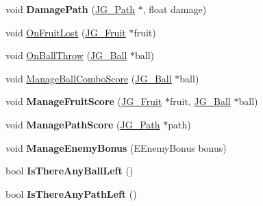 \begin{DoxyCompactItemize}
\item 
\hypertarget{class_j_g___game___main_a812e0b1a29d91eec2f14019050f218ad}{void {\bfseries Damage\-Path} (\hyperlink{class_j_g___path}{J\-G\-\_\-\-Path} $\ast$, float damage)}\label{class_j_g___game___main_a812e0b1a29d91eec2f14019050f218ad}

\item 
void \hyperlink{class_j_g___game___main_aa127943d6acddb67599f5f3c521036d4}{On\-Fruit\-Lost} (\hyperlink{class_j_g___fruit}{J\-G\-\_\-\-Fruit} $\ast$fruit)
\item 
void \hyperlink{class_j_g___game___main_a3f4638b76e1e77c65c09da991f650ba6}{On\-Ball\-Throw} (\hyperlink{class_j_g___ball}{J\-G\-\_\-\-Ball} $\ast$ball)
\item 
void \hyperlink{class_j_g___game___main_ab239739c2b97a9142033fb82663d7a06}{Manage\-Ball\-Combo\-Score} (\hyperlink{class_j_g___ball}{J\-G\-\_\-\-Ball} $\ast$ball)
\item 
\hypertarget{class_j_g___game___main_afb2172d8b7a81a333cc80086bd45b602}{void {\bfseries Manage\-Fruit\-Score} (\hyperlink{class_j_g___fruit}{J\-G\-\_\-\-Fruit} $\ast$fruit, \hyperlink{class_j_g___ball}{J\-G\-\_\-\-Ball} $\ast$ball)}\label{class_j_g___game___main_afb2172d8b7a81a333cc80086bd45b602}

\item 
\hypertarget{class_j_g___game___main_a70734f6453c3e3014e0cfc2f501e3963}{void {\bfseries Manage\-Path\-Score} (\hyperlink{class_j_g___path}{J\-G\-\_\-\-Path} $\ast$path)}\label{class_j_g___game___main_a70734f6453c3e3014e0cfc2f501e3963}

\item 
\hypertarget{class_j_g___game___main_ac5458eda3344af1f31fa97b5d1000f62}{void {\bfseries Manage\-Enemy\-Bonus} (E\-Enemy\-Bonus bonus)}\label{class_j_g___game___main_ac5458eda3344af1f31fa97b5d1000f62}

\item 
\hypertarget{class_j_g___game___main_a9c8fad5fdfbf1beb715db909d93e88e5}{bool {\bfseries Is\-There\-Any\-Ball\-Left} ()}\label{class_j_g___game___main_a9c8fad5fdfbf1beb715db909d93e88e5}

\item 
\hypertarget{class_j_g___game___main_a5230ba7a6a74b943bad2653a522d0d0f}{bool {\bfseries Is\-There\-Any\-Path\-Left} ()}\label{class_j_g___game___main_a5230ba7a6a74b943bad2653a522d0d0f}


\end{DoxyCompactItemize}
